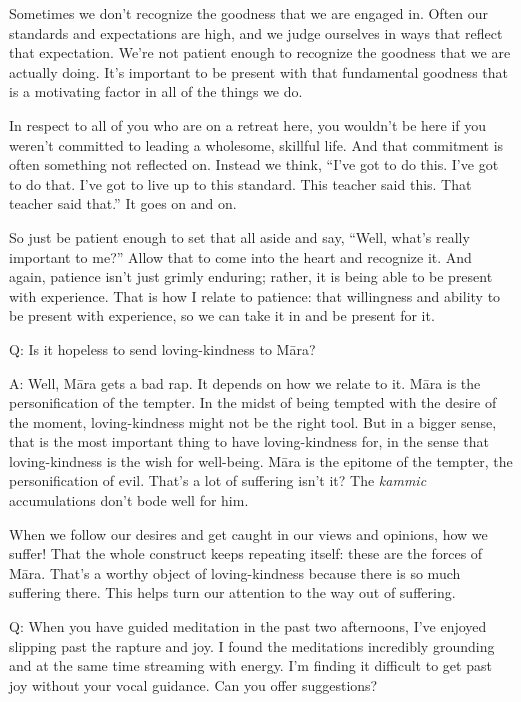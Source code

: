 Sometimes we don’t recognize the goodness that we are engaged in. Often
our standards and expectations are high, and we judge ourselves in ways
that reflect that expectation. We’re not patient enough to recognize the
goodness that we are actually doing. It’s important to be present with
that fundamental goodness that is a motivating factor in all of the
things we do.

In respect to all of you who are on a retreat here, you wouldn’t be here
if you weren’t committed to leading a wholesome, skillful life. And that
commitment is often something not reflected on. Instead we think, “I’ve
got to do this. I’ve got to do that. I’ve got to live up to this
standard. This teacher said this. That teacher said that.” It goes on
and on.

So just be patient enough to set that all aside and say, “Well, what’s
really important to me?” Allow that to come into the heart and recognize
it. And again, patience isn’t just grimly enduring; rather, it is being
able to be present with experience. That is how I relate to patience:
that willingness and ability to be present with experience, so we can
take it in and be present for it.

\qaspace
Q: Is it hopeless to send loving-kindness to Māra?

\qaspace
A: Well, Māra gets a bad rap. It depends on how we relate to it. Māra is
the personification of the tempter. In the midst of being tempted with
the desire of the moment, loving-kindness might not be the right tool.
But in a bigger sense, that is the most important thing to have
loving-kindness for, in the sense that loving-kindness is the wish for
well-being. Māra is the epitome of the tempter, the personification of
evil. That’s a lot of suffering isn’t it? The \emph{kammic}
accumulations don’t bode well for him.

When we follow our desires and get caught in our views and opinions, how
we suffer! That the whole construct keeps repeating itself: these are
the forces of Māra. That’s a worthy object of loving-kindness because
there is so much suffering there. This helps turn our attention to the
way out of suffering.

\qaspace
Q: When you have guided meditation in the past two afternoons, I’ve
enjoyed slipping past the rapture and joy. I found the meditations
incredibly grounding and at the same time streaming with energy. I’m
finding it difficult to get past joy without your vocal guidance. Can
you offer suggestions?

